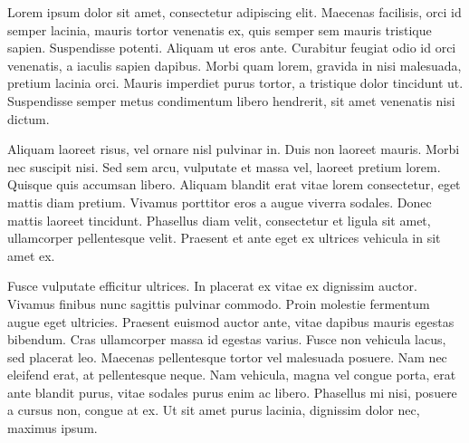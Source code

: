



\maketitle

Lorem ipsum dolor sit amet, consectetur adipiscing elit. Maecenas facilisis, orci id semper lacinia, mauris tortor venenatis ex, quis semper sem mauris tristique sapien. Suspendisse potenti. Aliquam ut eros ante. Curabitur feugiat odio id orci venenatis, a iaculis sapien dapibus. Morbi quam lorem, gravida in nisi malesuada, pretium lacinia orci. Mauris imperdiet purus tortor, a tristique dolor tincidunt ut. Suspendisse semper metus condimentum libero hendrerit, sit amet venenatis nisi dictum.


Aliquam laoreet risus, vel ornare nisl pulvinar in. Duis non laoreet mauris. Morbi nec suscipit nisi. Sed sem arcu, vulputate et massa vel, laoreet pretium lorem. Quisque quis accumsan libero. Aliquam blandit erat vitae lorem consectetur, eget mattis diam pretium. Vivamus porttitor eros a augue viverra sodales. Donec mattis laoreet tincidunt. Phasellus diam velit, consectetur et ligula sit amet, ullamcorper pellentesque velit. Praesent et ante eget ex ultrices vehicula in sit amet ex.


Fusce vulputate efficitur ultrices. In placerat ex vitae ex dignissim auctor. Vivamus finibus nunc sagittis pulvinar commodo. Proin molestie fermentum augue eget ultricies. Praesent euismod auctor ante, vitae dapibus mauris egestas bibendum. Cras ullamcorper massa id egestas varius. Fusce non vehicula lacus, sed placerat leo. Maecenas pellentesque tortor vel malesuada posuere. Nam nec eleifend erat, at pellentesque neque. Nam vehicula, magna vel congue porta, erat ante blandit purus, vitae sodales purus enim ac libero. Phasellus mi nisi, posuere a cursus non, congue at ex. Ut sit amet purus lacinia, dignissim dolor nec, maximus ipsum.



